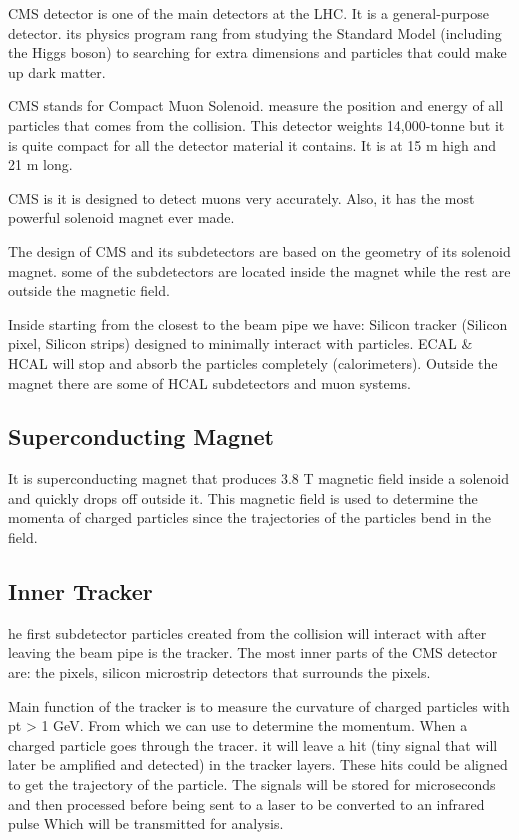 
CMS detector is one of the main detectors at the LHC. It is a general-purpose detector. its physics program rang from studying the Standard Model (including the Higgs boson) to searching for extra dimensions and particles that could make up dark matter. 

CMS stands for Compact Muon Solenoid. measure the position and energy of all particles that comes from the collision. This detector weights 14,000-tonne but it is quite compact for all the detector material it contains. It is at 15 m high and 21 m long. 

CMS is it is designed to detect muons very accurately. Also, it has the most powerful solenoid magnet ever made. 

The design of CMS and its subdetectors are based on the geometry of its solenoid magnet. some of the subdetectors are located inside the magnet while the rest are outside the magnetic field. 

Inside starting from the closest to the beam pipe we have: Silicon tracker (Silicon pixel, Silicon strips) designed to minimally interact with particles. ECAL & HCAL will stop and absorb the particles completely (calorimeters).  Outside the magnet there are some of HCAL subdetectors and muon systems.

\subsection{Superconducting Magnet} 

It is superconducting magnet that produces 3.8 T magnetic field inside a solenoid and quickly drops off outside it. This magnetic field is used to determine the momenta of charged particles since the trajectories of the particles bend in the field.


\subsection{Inner Tracker} 

he first subdetector particles created from the collision will interact with after leaving the beam pipe is the tracker. The most inner parts of the CMS detector are: the pixels, silicon microstrip detectors that surrounds the pixels. 

Main function of the tracker is to measure the curvature of charged particles with pt > 1 GeV. From which we can use to determine the momentum. When a charged particle goes through the tracer.
it will leave a hit (tiny signal that will later be amplified and detected) in the tracker layers. These hits could be aligned to get the trajectory of the particle. The signals will be stored
for microseconds and then processed before being sent to a laser to be converted to an infrared pulse Which will be transmitted for analysis.

